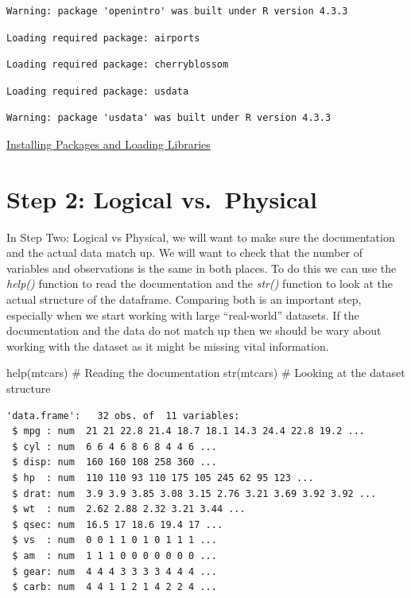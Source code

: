 \documentclass[
  letterpaper,
  DIV=11,
  numbers=noendperiod]{scrreprt}
\newenvironment{Shaded}{\begin{snugshade}}{\end{snugshade}}
\newcommand{\CommentTok}[1]{\textcolor[rgb]{0.37,0.37,0.37}{#1}}
\newcommand{\FunctionTok}[1]{\textcolor[rgb]{0.28,0.35,0.67}{#1}}
\newcommand{\NormalTok}[1]{\textcolor[rgb]{0.00,0.23,0.31}{#1}}
\begin{document}
\begin{verbatim}
Warning: package 'openintro' was built under R version 4.3.3
\end{verbatim}

\begin{verbatim}
Loading required package: airports
\end{verbatim}

\begin{verbatim}
Loading required package: cherryblossom
\end{verbatim}

\begin{verbatim}
Loading required package: usdata
\end{verbatim}

\begin{verbatim}
Warning: package 'usdata' was built under R version 4.3.3
\end{verbatim}

\begin{watch}{}{}
    \href{https://youtu.be/6UPqEI9-uFE}{Installing Packages and Loading Libraries}
\end{watch}

\section{Step 2: Logical
vs.~Physical}\label{step-2-logical-vs.-physical}

In Step Two: Logical vs Physical, we will want to make sure the
documentation and the actual data match up. We will want to check that
the number of variables and observations is the same in both places. To
do this we can use the \emph{help()} function to read the documentation
and the \emph{str()} function to look at the actual structure of the
dataframe. Comparing both is an important step, especially when we start
working with large ``real-world'' datasets. If the documentation and the
data do not match up then we should be wary about working with the
dataset as it might be missing vital information.

\begin{Shaded}
\begin{Highlighting}[]
\FunctionTok{help}\NormalTok{(mtcars) }\CommentTok{\# Reading the documentation}
\FunctionTok{str}\NormalTok{(mtcars) }\CommentTok{\# Looking at the dataset structure}
\end{Highlighting}
\end{Shaded}

\begin{verbatim}
'data.frame':   32 obs. of  11 variables:
 $ mpg : num  21 21 22.8 21.4 18.7 18.1 14.3 24.4 22.8 19.2 ...
 $ cyl : num  6 6 4 6 8 6 8 4 4 6 ...
 $ disp: num  160 160 108 258 360 ...
 $ hp  : num  110 110 93 110 175 105 245 62 95 123 ...
 $ drat: num  3.9 3.9 3.85 3.08 3.15 2.76 3.21 3.69 3.92 3.92 ...
 $ wt  : num  2.62 2.88 2.32 3.21 3.44 ...
 $ qsec: num  16.5 17 18.6 19.4 17 ...
 $ vs  : num  0 0 1 1 0 1 0 1 1 1 ...
 $ am  : num  1 1 1 0 0 0 0 0 0 0 ...
 $ gear: num  4 4 4 3 3 3 3 4 4 4 ...
 $ carb: num  4 4 1 1 2 1 4 2 2 4 ...
\end{verbatim}
\end{document}
